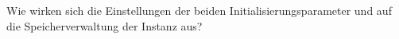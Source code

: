       \item Wie wirken sich die Einstellungen der beiden Initialisierungsparameter  und \newline {} auf die Speicherverwaltung der Instanz aus?
